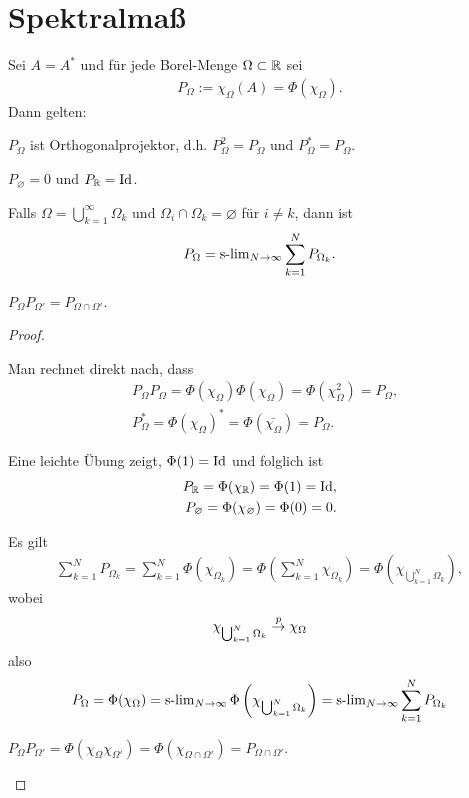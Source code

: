 \section{Spektralmaß}

\begin{prop}
\label{prop:6.4}
Sei $A=A^*$ und für jede Borel-Menge $\Omega\subset\mathbb{R}$ sei
\begin{align*}
P_\Omega := \chi_\Omega(A) = \Phi(\chi_\Omega).
\end{align*}
Dann gelten:
\begin{propenum}
\item\label{prop:6.4:1} $P_\Omega$ ist Orthogonalprojektor, d.h.
$P_\Omega^2=P_\Omega$ und $P_\Omega^*=P_\Omega$.
\item\label{prop:6.4:2} $P_\varnothing = 0$ und $P_{\mathbb{R}} = \mathrm{Id}$.
\item\label{prop:6.4:3} Falls $\Omega = \bigcup_{k=1}^\infty \Omega_k$ und
$\Omega_i\cap \Omega_k = \varnothing$ für $i\neq k$, dann ist
\begin{align*}
P_\Omega = \operatorname{s-lim}\limits_{N\to\infty} \sum_{k=1}^N P_{\Omega_k}.
\end{align*}
\item\label{prop:6.4:4} $P_\Omega P_{\Omega'} = P_{\Omega \cap
\Omega'}$.\fishhere
\end{propenum}
\end{prop}
\begin{proof}
\begin{proofenum}
\item Man rechnet direkt nach, dass
\begin{align*}
&P_\Omega P_\Omega = \Phi(\chi_\Omega)\Phi(\chi_\Omega)
= \Phi(\chi_\Omega^2) = P_\Omega,\\
&P_\Omega^* = \Phi(\chi_\Omega)^* = \Phi(\bar{\chi_\Omega}) = P_\Omega.
\end{align*}
\item Eine leichte Übung zeigt, $\Phi(1) = \mathrm{Id}$ und folglich ist
\begin{align*}
P_{\mathbb{R}} = \Phi(\chi_{\mathbb{R}}) = \Phi(1) = \mathrm{Id},\\
P_\varnothing = \Phi(\chi_\varnothing) = \Phi(0) = 0.
\end{align*}
\item Es gilt
\begin{align*}
\sum_{k=1}^N P_{\Omega_k} 
= \sum_{k=1}^N \Phi(\chi_{\Omega_k})
= \Phi\left(\sum_{k=1}^N \chi_{\Omega_k} \right)
= \Phi\left(\chi_{\bigcup_{k=1}^N\Omega_k} \right),
\end{align*}
wobei 
\begin{align*}
\chi_{\bigcup_{k=1}^N\Omega_k} \overset{p}{\to} \chi_{\Omega}
\end{align*}
also
\begin{align*}
P_\Omega =\Phi(\chi_\Omega) = \operatorname{s-lim}\limits_{N\to\infty}
\Phi\left(\chi_{\bigcup_{k=1}^N \Omega_k}\right)
= \operatorname{s-lim}\limits_{N\to\infty}\sum_{k=1}^N P_{\Omega_k}
\end{align*}
\item $P_\Omega P_{\Omega'} = \Phi(\chi_{\Omega}\chi_{\Omega'}) =
\Phi(\chi_{\Omega\cap \Omega'}) = P_{\Omega\cap \Omega'}$.\qedhere
\end{proofenum}
\end{proof}

